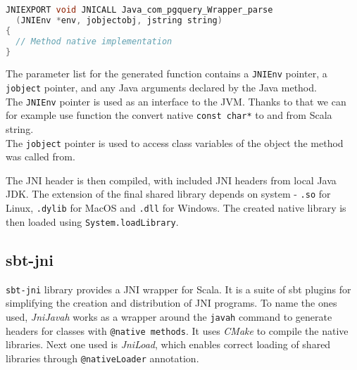 \begin{lstlisting}[language=c, basicstyle=\ttfamily, showstringspaces=false, caption={Generated JNI header}, xleftmargin=.05in]
JNIEXPORT void JNICALL Java_com_pgquery_Wrapper_parse
  (JNIEnv *env, jobjectobj, jstring string)
{
  // Method native implementation
}
\end{lstlisting}
The parameter list for the generated function contains a \texttt{JNIEnv} pointer, a \texttt{jobject} pointer, and any Java arguments declared by the Java method.\cite{What is JNI} \\
The \texttt{JNIEnv} pointer is used as an interface to the JVM. Thanks to that we can for example use function the convert native \texttt{const char*} to and from Scala string. \\
The \texttt{jobject} pointer is used to access class variables of the object the method was called from.

The JNI header is then compiled, with included JNI headers from local Java JDK. The extension of the final shared library depends on system - \texttt{.so} for Linux, \texttt{.dylib} for MacOS and \texttt{.dll} for Windows. The created native library is then loaded using \texttt{System.loadLibrary}.


\subsection{sbt-jni}
\texttt{sbt-jni} library provides a JNI wrapper for Scala. It is a suite of sbt plugins for simplifying the creation and distribution of JNI programs. To name the ones used, \textit{JniJavah} works as a wrapper around the \texttt{javah} command to generate headers for classes with \texttt{@native methods}. It uses \textit{CMake} to compile the native libraries.
Next one used is \textit{JniLoad}, which enables correct loading of shared libraries through \texttt{@nativeLoader} annotation. 

